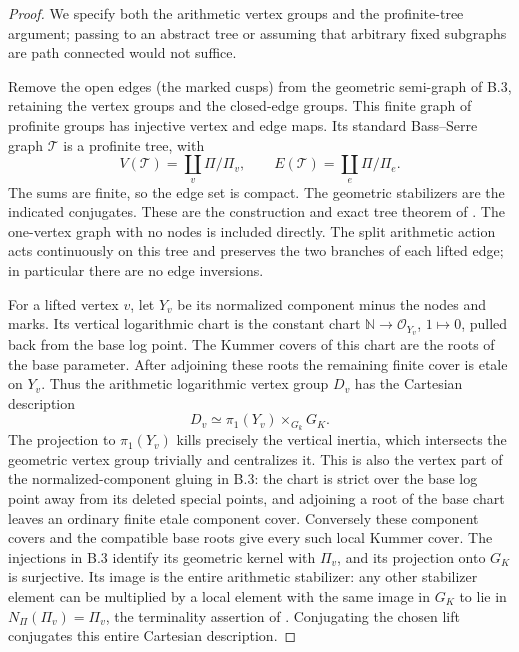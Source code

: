 \begin{proof}
We specify both the arithmetic vertex groups and the profinite-tree
argument; passing to an abstract tree or assuming that arbitrary fixed
subgraphs are path connected would not suffice.

Remove the open edges (the marked cusps) from the geometric semi-graph of
B.3, retaining the vertex groups and the closed-edge groups. This finite
graph of profinite groups has injective vertex and edge maps. Its standard
Bass--Serre graph $\mathcal T$ is a profinite tree, with
\[
 V(\mathcal T)=\coprod_v\Pi/\Pi_v,
 \qquad E(\mathcal T)=\coprod_e\Pi/\Pi_e.
\]
The sums are finite, so the edge set is compact. The geometric stabilizers
are the indicated conjugates. These are the construction and exact tree
theorem of \citet[\S3.7 and Proposition 3.8, pp.~419--420]{BC_ZM1989}.
The one-vertex graph with no nodes is included directly. The split
arithmetic action acts continuously on this tree and preserves the two
branches of each lifted edge; in particular there are no edge inversions.

For a lifted vertex $v$, let $Y_v$ be its normalized component minus the
nodes and marks. Its vertical logarithmic chart is the constant chart
$\mathbb N\to\mathcal O_{Y_v}$, $1\mapsto0$, pulled back from the base
log point. The Kummer covers of this chart are the roots of the base
parameter. After adjoining these roots the remaining finite cover is
etale on $Y_v$. Thus the arithmetic logarithmic vertex group $D_v$ has
the Cartesian description
\[
 D_v\simeq\pi_1(Y_v)\times_{G_k}G_K.
 \tag{B.vertex}
\]
The projection to $\pi_1(Y_v)$ kills precisely the vertical inertia,
which intersects the geometric vertex group trivially and centralizes it.
This is also the vertex part of the normalized-component gluing in B.3:
the chart is strict over the base log point away from its deleted special
points, and adjoining a root of the base chart leaves an ordinary finite
etale component cover. Conversely these component covers and the compatible
base roots give every such local Kummer cover. The injections in B.3
identify its geometric kernel with $\Pi_v$, and its projection onto $G_K$
is surjective. Its image is the entire arithmetic stabilizer: any other
stabilizer element can be multiplied by a local element with the same
image in $G_K$ to lie in $N_\Pi(\Pi_v)=\Pi_v$, the terminality assertion
of \citet[Proposition 1.2]{BC_MochComb}. Conjugating the chosen lift
conjugates this entire Cartesian description.


\end{proof}

